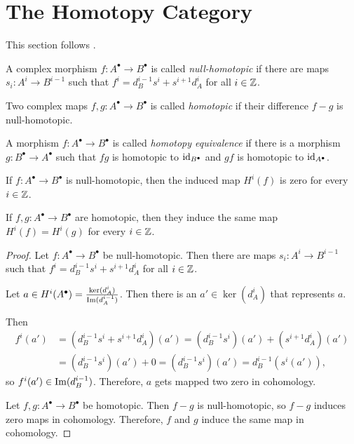 \section{The Homotopy Category}
This section follows \cite{weibel}.

\begin{definition}
    A complex morphism $f: A^\bullet \rightarrow B^\bullet$ is called \textit{null-homotopic} if there are maps $s_i: A^i \rightarrow B^{i-1}$ such that $f^i = d^{i-1}_Bs^{i} + s^{i+1}d^i_A$ for all $i \in {\mathbb Z}$.
\end{definition}

\begin{definition}
    Two complex maps $f,g: A^\bullet \rightarrow B^\bullet$ is called \textit{homotopic} if their difference $f - g$ is null-homotopic.

    A morphism $f: A^\bullet \rightarrow B^\bullet$ is called \textit{homotopy equivalence} if there is a morphism $g: B^\bullet \rightarrow A^\bullet$ such that $fg$ is homotopic to $\operatorname{id}_{B^\bullet}$ and $gf$ is homotopic to $\operatorname{id}_{A^\bullet}$.
\end{definition}

\begin{lemma}
    If $f: A^\bullet \rightarrow B^\bullet$ is null-homotopic, then the induced map $H^i(f)$ is zero for every $i \in {\mathbb Z}$.

    If $f,g: A^\bullet \rightarrow B^\bullet$ are homotopic, then they induce the same map $H^i(f) = H^i(g)$ for every $i \in {\mathbb Z}$.
\end{lemma}

\begin{proof}
    Let $f: A^\bullet \rightarrow B^\bullet$ be null-homotopic.
    Then there are maps $s_i: A^i \rightarrow B^{i-1}$ such that $f^i = d^{i-1}_Bs^{i} + s^{i+1}d^i_A$ for all $i \in {\mathbb Z}$.

    Let $a \in H^i(A^\bullet) = \frac{\ker(d^i_A)}{\operatorname{Im}(d^{i-1}_A)}$.
    Then there is an $a' \in \ker(d^i_A)$ that represents $a$.

    Then 
    \begin{align*}
        f^i(a') &= (d^{i-1}_Bs^{i} + s^{i+1}d^i_A)(a') = (d^{i-1}_Bs^{i})(a') + (s^{i+1}d^i_A)(a') \\
        &= (d^{i-1}_Bs^{i})(a') + 0 = (d^{i-1}_Bs^{i})(a') = d^{i-1}_B(s^i(a')),
    \end{align*}
    so $f^i(a') \in \operatorname{Im}(d^{i-1}_B)$.
    Therefore, $a$ gets mapped two zero in cohomology.

    Let $f,g: A^\bullet \rightarrow B^\bullet$ be homotopic.
    Then $f-g$ is null-homotopic, so $f-g$ induces zero maps in cohomology.
    Therefore, $f$ and $g$ induce the same map in cohomology.
\end{proof}

